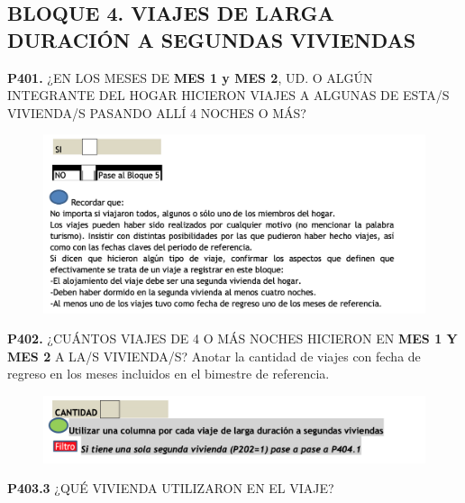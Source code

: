 \documentclass[
  openany]{book}
\begin{document}
\hypertarget{bloque-4.-viajes-de-larga-duraciuxf3n-a-segundas-viviendas}{%
\subsection{\texorpdfstring{\textbf{BLOQUE 4. VIAJES DE LARGA DURACIÓN A SEGUNDAS VIVIENDAS}}{BLOQUE 4. VIAJES DE LARGA DURACIÓN A SEGUNDAS VIVIENDAS}}\label{bloque-4.-viajes-de-larga-duraciuxf3n-a-segundas-viviendas}}

\textbf{P401.} ¿EN LOS MESES DE \textbf{MES 1 y MES 2}, UD. O ALGÚN INTEGRANTE DEL HOGAR HICIERON VIAJES A ALGUNAS DE ESTA/S VIVIENDA/S PASANDO ALLÍ 4 NOCHES O MÁS?

\begin{figure}

{\centering \includegraphics[width=1\linewidth]{imagenes/figura6-174} 

}

\end{figure}

\textbf{P402.} ¿CUÁNTOS VIAJES DE 4 O MÁS NOCHES HICIERON EN \textbf{MES 1 Y MES 2} A LA/S VIVIENDA/S?
Anotar la cantidad de viajes con fecha de regreso en los meses incluidos en el bimestre de referencia.

\begin{figure}

{\centering \includegraphics[width=1\linewidth]{imagenes/figura6-175} 

}

\end{figure}

\textbf{P403.3} ¿QUÉ VIVIENDA UTILIZARON EN EL VIAJE?
\end{document}
